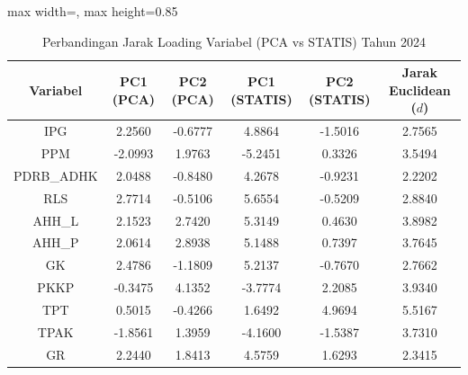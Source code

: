 \begin{table}[H]
\centering
\caption{Perbandingan Jarak Loading Variabel (PCA vs STATIS) Tahun 2024} \label{tab:appjarak_loading_2024}
\begin{adjustbox}{max width=\textwidth, max height=0.85\textheight}
\begin{tabular}{|c|c|c|c|c|c|}
\hline
\textbf{Variabel} & \textbf{PC1 (PCA)} & \textbf{PC2 (PCA)} & \textbf{PC1 (STATIS)} & \textbf{PC2 (STATIS)} & \textbf{Jarak Euclidean ($d$)} \\
\hline
IPG & 2.2560 & -0.6777 & 4.8864 & -1.5016 & 2.7565 \\
PPM & -2.0993 & 1.9763 & -5.2451 & 0.3326 & 3.5494 \\
PDRB\_ADHK & 2.0488 & -0.8480 & 4.2678 & -0.9231 & 2.2202 \\
RLS & 2.7714 & -0.5106 & 5.6554 & -0.5209 & 2.8840 \\
AHH\_L & 2.1523 & 2.7420 & 5.3149 & 0.4630 & 3.8982 \\
AHH\_P & 2.0614 & 2.8938 & 5.1488 & 0.7397 & 3.7645 \\
GK & 2.4786 & -1.1809 & 5.2137 & -0.7670 & 2.7662 \\
PKKP & -0.3475 & 4.1352 & -3.7774 & 2.2085 & 3.9340 \\
TPT & 0.5015 & -0.4266 & 1.6492 & 4.9694 & 5.5167 \\
TPAK & -1.8561 & 1.3959 & -4.1600 & -1.5387 & 3.7310 \\
GR & 2.2440 & 1.8413 & 4.5759 & 1.6293 & 2.3415 \\
\hline
\end{tabular}
\end{adjustbox}
\end{table}